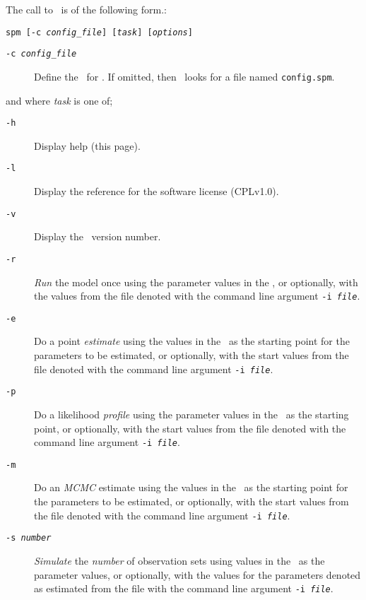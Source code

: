 The call to \SPM\ is of the following form.: 

\texttt{spm [-c \emph{config\_file}] [\emph{task}] [\emph{options}]}

\begin{description}
  \item [\texttt{-c \emph{config\_file}}] Define the \config\ for \SPM. If omitted, then \SPM\ looks for a file named \texttt{config.spm}.
\end{description}

and where \emph{task} is one of;
\begin{description}
\item [\texttt{-h}] Display help (this page).
\item [\texttt{-l}] Display the reference for the software license (CPLv1.0).
\item [\texttt{-v}] Display the \SPM\ version number.

\item [\texttt{-r}] \emph{Run} the model once using the parameter values in the \config, or optionally, with the values from the file denoted with the command line argument \texttt{-i \emph{file}}.

\item [\texttt{-e}] Do a point \emph{estimate} using the values in the \config\ as the starting point for the parameters to be estimated, or optionally, with the start values from the file denoted with the command line argument \texttt{-i \emph{file}}.

\item [\texttt{-p}] Do a likelihood \emph{profile} using the parameter values in the \config\ as the starting point, or optionally, with the start values from the file denoted with the command line argument \texttt{-i \emph{file}}.

\item [\texttt{-m}] Do an \emph{MCMC} estimate using the values in the \config\ as the starting point for the parameters to be estimated, or optionally, with the start values from the file denoted with the command line argument \texttt{-i \emph{file}}. 


\item [\texttt{-s \emph{number}}] \emph{Simulate} the \emph{number} of observation sets using values in the \config\ as the parameter values, or optionally, with the values for the parameters denoted as estimated from the file with the command line argument \texttt{-i \emph{file}}.

\end{description}

